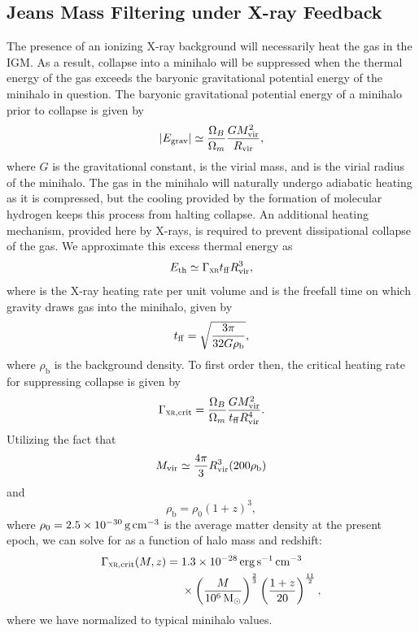 \documentclass[../thesis.tex]{subfiles}
\begin{document}
\subsection{Jeans Mass Filtering under X-ray Feedback}
\label{filtering}
The presence of an ionizing X-ray background will necessarily heat the
gas in the IGM.  As a result, collapse into a minihalo will be
suppressed when the thermal energy of the gas exceeds the
baryonic gravitational potential energy of the minihalo in question.  The
baryonic gravitational potential energy of a minihalo prior to collapse is given by
\begin{equation}
  \left|{E}_{\mathrm{grav}}\right| \simeq \frac{\Omega_B}{\Omega_m} \frac{G {M}_{\mathrm{vir}}^2}{{R}_{\mathrm{vir}}},
\end{equation}
where $G$ is the gravitational constant, \mvir is the virial mass, and \rvir is the virial radius of the minihalo.
The gas in the minihalo will naturally undergo adiabatic heating as it
is compressed, but the cooling provided by the formation of molecular hydrogen keeps this process from halting collapse.  An additional heating
mechanism, provided here by X-rays, is required to prevent dissipational collapse of the gas.  We approximate this
excess thermal energy \etherm as
\begin{equation}
  {E}_{\mathrm{th}} \simeq \Gamma_{\textsc{xr}} {t}_{\mathrm{ff}} {R}_{\mathrm{vir}}^3,
\end{equation}
where \gxr is the X-ray heating rate per unit volume and \tff is the freefall
time on which gravity draws gas into the minihalo, given by
\begin{equation}
  {t}_{\mathrm{ff}} = \sqrt{\frac{3\pi}{32 G \rho_{\mathrm b}}},
\end{equation}
where $\rho_{\mathrm b}$ is the background density. To first order then, the critical heating rate \gcrit for suppressing collapse  is  given by
\begin{equation}
  \Gamma_{\textsc{xr}, \mathrm{crit}} = \frac{\Omega_B}{\Omega_m} \frac{G {M}_{\mathrm{vir}}^2}{{t}_{\mathrm{ff}} {R}_{\mathrm{vir}}^4}.
\end{equation}
Utilizing the fact that 
\begin{equation}
  {M}_{\mathrm{vir}} \simeq \frac{4\pi}{3}{R}_{\mathrm{vir}}^3 (200 \rho_{\mathrm b})
\end{equation} 
and
\begin{equation}
  \rho_{\mathrm b} = \rho_0 (1+z)^3,
\end{equation}
where $\rho_0 = 2.5\times10^{-30}\,{\mathrm g}\,\mathrm{cm}^{-3}$ is the average matter density at the present epoch, we can solve for \gcrit as a function of halo mass and redshift:
\begin{equation}
  \begin{split}
    \Gamma_{\textsc{xr}, \mathrm{crit}}(M,z) = \; & 1.3\times10^{-28} \,\mathrm{erg}\,\mathrm{s}^{-1}\,\mathrm{cm}^{-3} \\  
    &\times \left(\frac{M}{10^6\,\mathrm{M}_{\odot}}\right)^{\frac{2}{3}} 
    \left(\frac{1+z}{20}\right)^{\frac{11}{2}},
  \end{split}
\end{equation}
where we have normalized to typical minihalo values.  
\end{document}
